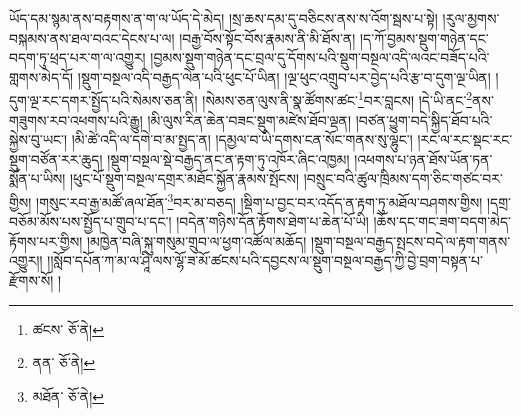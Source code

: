 ཡོད་དམ་སྙམ་ནས་བརྟགས་ན་ག་ལ་ཡོད་དེ་མེད། །སྲ་ཆས་དམ་དུ་བཅིངས་ནས་ས་འོག་སྦས་པ་སྟེ། །རུལ་མྱགས་བསྐམས་ནས་ཐལ་བའང་དེངས་པ་ལ། །བརྒྱ་བོས་སྟོང་བོས་རྣམས་ནི་མི་ཐོས་ན། །ད་ཀོ་བྱམས་སྡུག་གཉེན་དང་བདག་ཏུ་ཕྲད་པར་ག་ལ་འགྱུར། །བྱམས་སྡུག་གཉེན་དང་བྲལ་དུ་དོགས་པའི་སྡུག་བསྔལ་འདི་ལའང་བཟོད་པའི་གླགས་མེད་དོ། །སྡུག་བསྔལ་འདི་བརྒྱད་ལེན་པའི་ཕུང་པོ་ཡིན། །ལྔ་ཕུང་འགྲུབ་པར་བྱེད་པའི་རྩ་བ་དུག་ལྔ་ཡིན། །དུག་ལྔ་རང་དགར་སྤྱོད་པའི་སེམས་ཅན་ནི། །སེམས་ཅན་ལུས་ནི་སྣ་ཚོགས་ཚང་\footnote{ཚངས་  ཅོ་ནེ། }བར་བླངས། །དེ་ཡི་ནང་\footnote{ནན་  ཅོ་ནེ། }ནས་གཟུགས་རབ་འཕགས་པའི་རྒྱུ། །མི་ལུས་རིན་ཆེན་བཟང་སྡུག་མཛེས་ཐོབ་ལྡན། །བཙན་ཕྱུག་བདེ་སྐྱིད་ཐོབ་པའི་སྐྱེས་བུ་ཡང་། །མི་ཚེ་འདི་ལ་དགེ་བ་མ་སྤྱད་ན། །དམྱལ་བ་ཡི་དགས་ངན་སོང་གནས་སུ་ལྷུང་། །རང་ལ་རང་སྡང་རང་སྡུག་བཙོན་རར་ཆུད། །སྡུག་བསྔལ་སྡེ་བརྒྱད་ནང་ན་རྟག་ཏུ་འཁོར་ཞིང་འཁྱམ། །འཕགས་པ་ཉན་ཐོས་ཡོན་ཏན་སྨོན་པ་ཡིས། །ཕུང་པོ་སྡུག་བསྔལ་དགྲར་མཐོང་སྐྱོན་རྣམས་སྤོངས། །བསྲུང་བའི་ཚུལ་ཁྲིམས་དག་ཅིང་གཙང་བར་གྱིས། །གསུང་རབ་རྒྱ་མཚོ་ཞལ་ཐོན་\footnote{མཐོན་  ཅོ་ནེ། }བར་མ་བཅད། །སྡིག་པ་བྱང་བར་འདོད་ན་རྟག་ཏུ་མཐོལ་བཤགས་གྱིས། །དགྲ་བཅོམ་མོས་པས་སྤྱོད་པ་གྲུབ་པ་དང་། །བདེན་གཉིས་དོན་རྟོགས་ཐེག་པ་ཆེན་པོ་ཡི། །ཆོས་དང་གང་ཟག་བདག་མེད་རྟོགས་པར་གྱིས། །མཁྱེན་བཞི་སྐུ་གསུམ་གྲུབ་ལ་ཕྱག་འཚོལ་མཆོད། །སྡུག་བསྔལ་བརྒྱད་སྤངས་བདེ་ལ་རྟག་གནས་འགྱུར།། །།སློབ་དཔོན་ཀ་མ་ལ་ཤཱི་ལས་ལྷོ་ཟ་མོ་ཚངས་པའི་དབྱངས་ལ་སྡུག་བསྔལ་བརྒྱད་ཀྱི་བྱེ་བྲག་བསྟན་པ་རྫོགས་སོ། ། 